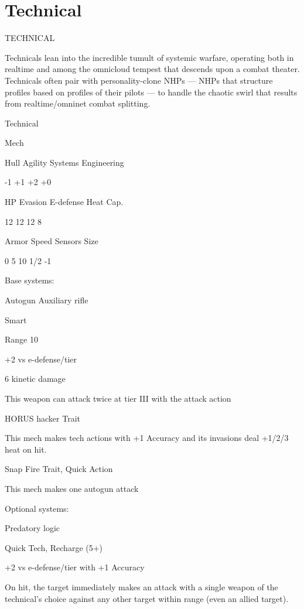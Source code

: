 \section{Technical}
                                              TECHNICAL

Technicals lean into the incredible tumult of systemic warfare, operating both in realtime and
among the omnicloud tempest that descends upon a combat theater. Technicals often pair with
personality-clone NHPs — NHPs that structure profiles based on profiles of their pilots — to
handle the chaotic swirl that results from realtime/omninet combat splitting.

 Technical

 Mech

 Hull       Agility      Systems       Engineering

 -1         +1           +2            +0

 HP         Evasion      E-defense     Heat Cap.

 12          12          12            8

 Armor      Speed        Sensors       Size

 0          5            10            1/2 -1

Base systems:

Autogun
Auxiliary rifle

Smart

Range 10

+2 vs e-defense/tier

6 kinetic damage

This weapon can attack twice at tier III with the attack action


HORUS hacker
Trait

This mech makes tech actions with +1 Accuracy and its invasions deal +1/2/3 heat on hit.


Snap Fire
Trait, Quick Action

This mech makes one autogun attack


Optional systems:

Predatory logic

Quick Tech, Recharge (5+)

+2 vs e-defense/tier with +1 Accuracy





On hit, the target immediately makes an attack with a single weapon of the technical’s choice
against any other target within range (even an allied target).


